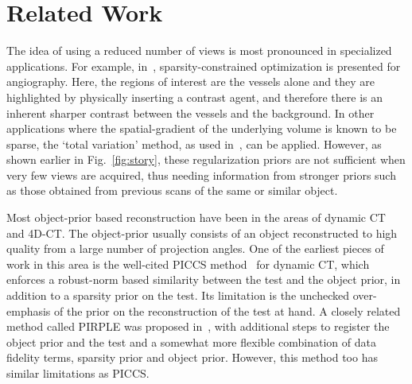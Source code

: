 \documentclass[journal]{IEEEtran}
\begin{document}

 \section{Related Work}
 \label{sec:related}
 The idea of using a reduced number of views is most pronounced in
 specialized applications. For example, in~\cite{Essam2015},
 sparsity-constrained optimization is presented for angiography. Here,
 the regions of interest are the vessels alone and they are
 highlighted by physically inserting a contrast agent, and therefore
 there is an inherent sharper contrast between the vessels and the
 background.  In other applications where the spatial-gradient of the
 underlying volume is known to be sparse, the `total variation'
 method, as used in~\cite{Li2015,Polak2017}, can be applied.  However,
 as shown earlier in Fig.~\ref{fig:story}, these regularization priors
 are not sufficient when very few views are acquired, thus needing
 information from stronger priors such as those obtained from previous
 scans of the same or similar object.


Most object-prior based reconstruction have been in the areas of
dynamic CT and 4D-CT. %
The object-prior usually consists of an object reconstructed to high
quality from a large number of projection angles. One of the earliest
pieces of work in this area is the well-cited PICCS
method~\cite{PICCS} for dynamic CT, which enforces a robust-norm based
similarity between the test and the object prior, in addition to a
sparsity prior on the test. Its limitation is the unchecked
over-emphasis of the prior on the reconstruction of the test at
hand. A closely related method called PIRPLE was proposed
in~\cite{pirple}, with additional steps to register the object prior
and the test and a somewhat more flexible combination of data fidelity
terms, sparsity prior and object prior. However, this method too has
similar limitations as PICCS.
\end{document}
